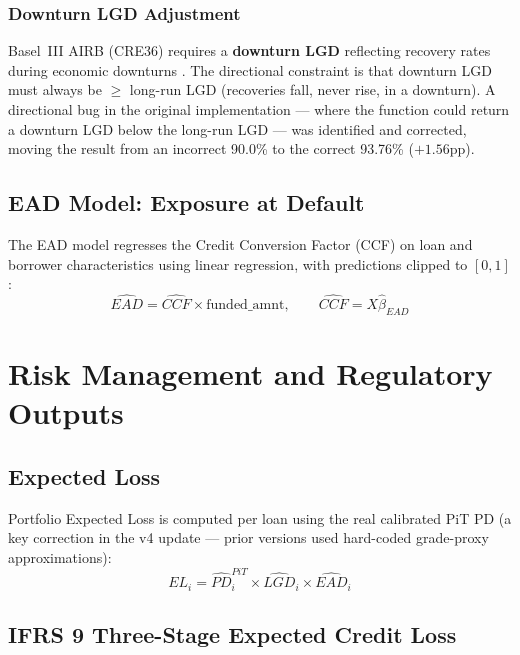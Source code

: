 \documentclass[12pt,a4paper]{report}
\begin{document}
\subsection{Downturn LGD Adjustment}

Basel~III AIRB (CRE36) requires a \textbf{downturn LGD} reflecting recovery rates during economic downturns \cite{bcbs2022}. The directional constraint is that downturn LGD must always be $\geq$ long-run LGD (recoveries fall, never rise, in a downturn). A directional bug in the original implementation --- where the function could return a downturn LGD below the long-run LGD --- was identified and corrected, moving the result from an incorrect 90.0\% to the correct 93.76\% ($+1.56$pp).

\section{EAD Model: Exposure at Default}

The EAD model regresses the Credit Conversion Factor (CCF) on loan and borrower characteristics using linear regression, with predictions clipped to $[0, 1]$:
\begin{equation}
  \hat{EAD} = \hat{CCF} \times \text{funded\_amnt}, \qquad \hat{CCF} = X\hat{\beta}_{EAD}
\end{equation}

\chapter{Risk Management and Regulatory Outputs}
\label{ch:risk}

\section{Expected Loss}

Portfolio Expected Loss is computed per loan using the real calibrated PiT PD (a key correction in the v4 update --- prior versions used hard-coded grade-proxy approximations):
\begin{equation}
  EL_i = \hat{PD}_i^{PiT} \times \hat{LGD}_i \times \hat{EAD}_i
\end{equation}

\section{IFRS 9 Three-Stage Expected Credit Loss}
\end{document}

